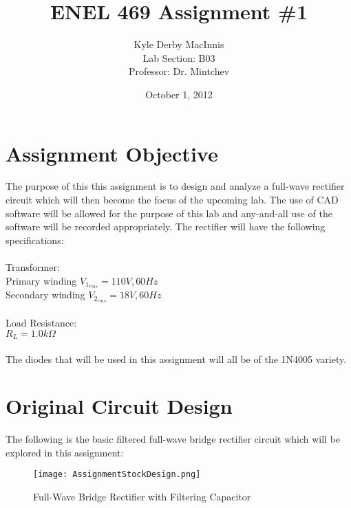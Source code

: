 \documentclass[]{article}
\title{\textbf{ENEL 469 Assignment \#1}}
\author{Kyle Derby MacInnis \\ Lab Section: B03 \\ Professor: Dr. Mintchev}
\date{October 1, 2012}
\begin{document}
\maketitle

\pagebreak

\section*{Assignment Objective}
{
	The purpose of this this assignment is to design and analyze a full-wave rectifier circuit which will then become the focus of the upcoming lab. The use of CAD software will be allowed for the purpose of this lab and any-and-all use of the software will be recorded appropriately. The rectifier will have the following specifications:
	\\ \\
	Transformer:
	\\	\indent Primary winding $V_{1_{rms}} = 110V, 60Hz$
	\\	\indent Secondary winding $V_{2_{rms}} = 18V, 60Hz$
	\\ \\
	Load Resistance:
	\\	\indent $R_L = 1.0k\Omega$
	\\ \\
	The diodes that will be used in this assignment will all be of the 1N4005 variety.
}

\section*{Original Circuit Design}
{
	The following is the basic filtered full-wave bridge rectifier circuit which will be explored in this assignment:
	\begin{figure}[here]
		\texttt{[image: AssignmentStockDesign.png]}
		\caption{Full-Wave Bridge Rectifier with Filtering Capacitor}
	\end{figure}
}

\pagebreak

\end{document}
